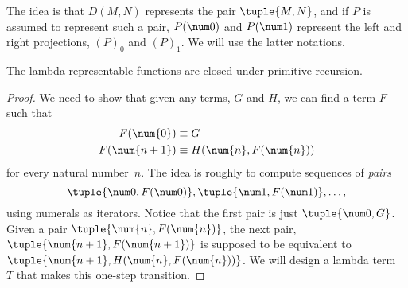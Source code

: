 \documentclass[../../../include/open-logic-section]{subfiles}
\begin{document}
The idea is that $D(M,N)$ represents the pair $\tuple{M, N}$, and if
$P$ is assumed to represent such a pair, $P(\num 0)$ and $P(\num 1)$
represent the left and right projections, $(P)_0$ and $(P)_1$. We will
use the latter notations.

\begin{lem}
The lambda representable functions are closed under primitive recursion.
\end{lem}

\begin{proof}
We need to show that given any terms, $G$ and $H$, we can find a term
$F$ such that
\begin{align*}
F(\num{0}) & \equiv G \\
F(\num{n+1}) & \equiv H(\num{n}, F(\num{n}))
\end{align*}
for every natural number~$n$. The idea is roughly to compute sequences
of \emph{pairs}
\[
\tuple{\num 0, F(\num 0)}, \tuple{\num 1, F(\num 1)}, \dots,
\]
using numerals as iterators. Notice that the first pair is just
$\tuple{\num 0, G}$. Given a pair $\tuple{\num{n}, F(\num{n})}$, the
next pair, $\tuple{\num{n+1}, F(\num{n+1})}$ is supposed to
be equivalent to $\tuple{\num{n+1}, H(\num{n}, F(\num{n}))}$. We
will design a lambda term~$T$ that makes this one-step transition.


\end{proof}
\end{document}
